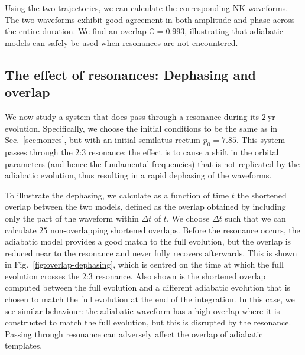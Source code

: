 \documentclass[aps,prd,amsfonts,amssymb,amsmath,nofootinbib,showpacs,superscriptaddress,twocolumn,floatfix]{revtex4-1}
\newcommand{\figref}[1]{Fig.~\ref{fig:#1}}
\newcommand{\secref}[1]{Sec.~\ref{sec:#1}}
\begin{document}
Using the two trajectories, we can calculate the corresponding NK waveforms. The two waveforms exhibit good agreement in both amplitude and phase across the entire duration. We find an overlap $\mathbb{O} = 0.993$, illustrating that adiabatic models can safely be used when resonances are not encountered.

\subsection{The effect of resonances: Dephasing and overlap}
\label{sec:effres-phase}

We now study a system that does pass through a resonance during its $2~\mathrm{yr}$ evolution. Specifically, we choose the initial conditions to be the same as in \secref{nonres}, but with an initial semilatus rectum $p_0 = 7.85$. This system passes through the $2$:$3$ resonance; the effect is to cause a shift in the orbital parameters (and hence the fundamental frequencies) that is not replicated by the adiabatic evolution, thus resulting in a rapid dephasing of the waveforms.

To illustrate the dephasing, we calculate as a function of time $t$ the shortened overlap between the two models, defined as the overlap obtained by including only the part of the waveform within $\Delta t$ of $t$. We choose $\Delta t$ such that we can calculate $25$ non-overlapping shortened overlaps. Before the resonance occurs, the adiabatic model provides a good match to the full evolution, but the overlap is reduced near to the resonance and never fully recovers afterwards. This is shown in \figref{overlap-dephasing}, which is centred on the time at which the full evolution crosses the $2$:$3$ resonance. Also shown is the shortened overlap computed between the full evolution and a different adiabatic evolution that is chosen to match the full evolution at the end of the integration. In this case, we see similar behaviour: the adiabatic waveform has a high overlap where it is constructed to match the full evolution, but this is disrupted by the resonance. Passing through resonance can adversely affect the overlap of adiabatic templates.
\end{document}
